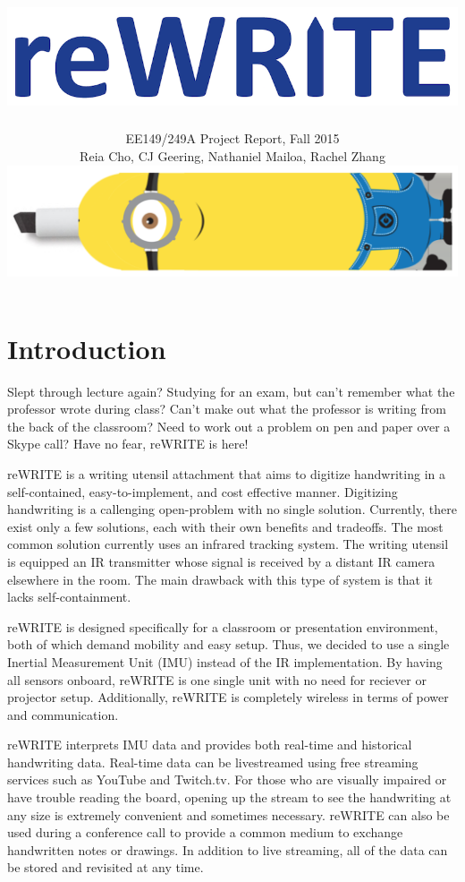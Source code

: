 \documentclass[10pt,journal]{IEEEtran}
\begin{document}
\title{\includegraphics[width=0.4\linewidth]{figures/rewrite}}

\author{EE149/249A Project Report, Fall 2015

Reia Cho, CJ Geering, Nathaniel Mailoa, Rachel Zhang

\includegraphics[width=0.45\linewidth]{figures/minion}}


\maketitle


\section{Introduction}
\par Slept through lecture again? Studying for an exam, but can't remember what the professor wrote during class? Can't make out what the professor is writing from the back of the classroom? Need to work out a problem on pen and paper over a Skype call? Have no fear, reWRITE is here!
\par reWRITE is a writing utensil attachment that aims to digitize handwriting in a self-contained, easy-to-implement, and cost effective manner. Digitizing handwriting is  a callenging open-problem with no single solution. Currently, there exist only a few solutions, each with their own benefits and tradeoffs. The most common solution currently uses an infrared tracking system. The writing utensil is equipped an IR transmitter whose signal is received by a distant IR camera elsewhere in the room. The main drawback with this type of system is that it lacks self-containment.
\par reWRITE is designed specifically for a classroom or presentation environment, both of which demand mobility and easy setup. Thus, we decided to use a single Inertial Measurement Unit (IMU) instead of the IR implementation. By having all sensors onboard, reWRITE is one single unit with no need for reciever or projector setup. Additionally, reWRITE is completely wireless in terms of power and communication.
\par reWRITE interprets IMU data and provides both real-time and historical handwriting data. Real-time data can be livestreamed using free streaming services such as YouTube and Twitch.tv. For those who are visually impaired or have trouble reading the board, opening up the stream to see the handwriting at any size is extremely convenient and sometimes necessary. reWRITE can also be used during a conference call to provide a common medium to exchange handwritten notes or drawings. In addition to live streaming, all of the data can be stored and revisited at any time.
\end{document}

